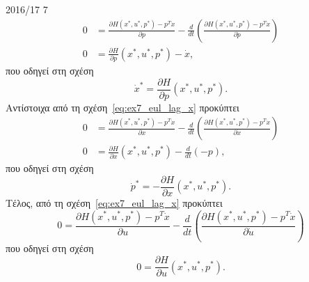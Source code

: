 \begin{solution}{2016/17 7}
    \begin{align*}
        0 &= \frac{\partial H(x^*, u^*, p^*) - p^{T}\dot{x}}{\partial p} -
        \frac{d}{dt}\left(
        \frac{\partial H(x^*, u^*, p^*) - p^{T}\dot{x}}{\partial \dot{p}}\right)
        \\
        0 &= \frac{\partial H}{\partial p} (x^*, u^*, p^*) - \dot{x},
    \end{align*}
    που οδηγεί στη σχέση
    \begin{equation}\label{eq:ex7_Hx_star}
        \dot{x}^* = \frac{\partial H}{\partial p} (x^*, u^*, p^*).
    \end{equation}
    Αντίστοιχα από τη σχέση~\eqref{eq:ex7_eul_lag_x} προκύπτει
    \begin{align*}
        0 &= \frac{\partial H(x^*, u^*, p^*) - p^{T}\dot{x}}{\partial x} -
        \frac{d}{dt}\left(
        \frac{\partial H(x^*, u^*, p^*) - p^{T}\dot{x}}{\partial \dot{x}}\right)
        \\
        0 &= \frac{\partial H}{\partial x} (x^*, u^*, p^*) - \frac{d}{dt}(-p),
    \end{align*}
    που οδηγεί στη σχέση
    \begin{equation}\label{eq:ex7_Hp_star}
        \dot{p}^* = -\frac{\partial H}{\partial x} (x^*, u^*, p^*).
    \end{equation}
    Τέλος, από τη σχέση~\eqref{eq:ex7_eul_lag_x} προκύπτει
    \[
        0 = \frac{\partial H(x^*, u^*, p^*) - p^{T}\dot{x}}{\partial u} -
        \frac{d}{dt}\left(
        \frac{\partial H(x^*, u^*, p^*) - p^{T}\dot{x}}{\partial \dot{u}}\right)
    \]
    που οδηγεί στη σχέση
    \begin{equation}\label{eq:ex7_Hu_star}
        0 = \frac{\partial H}{\partial u} (x^*, u^*, p^*).
    \end{equation}


\end{solution}
